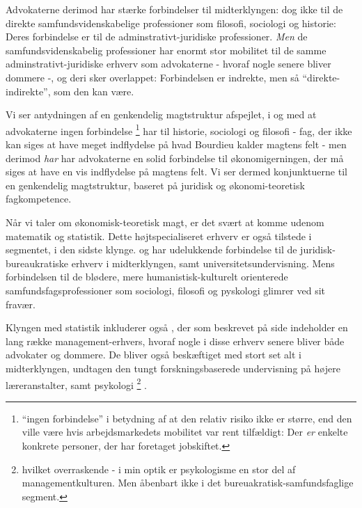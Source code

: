 Advokaterne  derimod har stærke forbindelser til midterklyngen: dog ikke til de direkte samfundsvidenskabelige professioner som filosofi, sociologi og historie: Deres forbindelse er til de adminstrativt-juridiske professioner. \emph{Men} de samfundsvidenskabelig professioner har enormt stor mobilitet til de samme adminstrativt-juridiske erhverv som advokaterne - hvoraf nogle senere bliver dommere -, og deri sker overlappet: Forbindelsen er indrekte, men så “direkte-indirekte”, som den kan være. 

Vi ser antydningen af en genkendelig magtstruktur afspejlet, i og med at advokaterne ingen forbindelse%
%
\footnote{ “ingen forbindelse” i betydning af at den relativ risiko ikke er større, end den ville være hvis arbejdsmarkedets mobilitet var rent tilfældigt: Der \emph{er} enkelte konkrete personer, der har foretaget jobskiftet.}%
%
 har til historie, sociologi og filosofi - fag, der ikke kan siges at have meget indflydelse på hvad Bourdieu kalder magtens felt - men derimod \emph{har} har advokaterne en solid forbindelse til økonomigerningen, der må siges at have en vis indflydelse på magtens felt. Vi ser dermed konjunktuerne til en genkendelig magtstruktur, baseret på juridisk og økonomi-teoretisk fagkompetence.

Når vi taler om økonomisk-teoretisk magt, er det svært at komme udenom matematik og statistik. Dette højtspecialiseret erhverv er også tilstede i segmentet, i den sidste klynge.  og  har udelukkende forbindelse til de juridisk-bureaukratiske erhverv i midterklyngen, samt universitetsundervisning. Mens forbindelsen til de blødere, mere humanistisk-kulturelt orienterede samfundsfagsprofessioner som sociologi, filosofi og pyskologi glimrer ved sit fravær.


Klyngen med statistik inkluderer også , der som beskrevet på side \pageref{d2419 forklaring} indeholder en lang række management-erhvers, hvoraf nogle i disse erhverv senere bliver både advokater og dommere. De bliver også beskæftiget med stort set alt i midterklyngen, undtagen den tungt forskningsbaserede undervisning på højere læreranstalter, samt psykologi%
%
\footnote{ hvilket overraskende - i min optik er psykologisme en stor del af managementkulturen. Men åbenbart ikke i det bureuakratisk-samfundsfaglige segment.}%
%
. 

